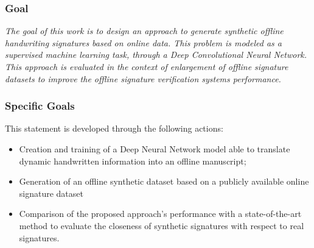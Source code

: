 \documentclass{beamer}
\begin{document}
\begin{frame}
\frametitle{Goal}

\centering\Large\textit{The goal of this work is to design an approach to generate synthetic offline handwriting signatures based on online data. 
This problem is modeled as a supervised machine learning task, through a Deep Convolutional Neural Network.
This approach is evaluated in the context of enlargement of offline signature datasets to improve the offline signature verification systems performance.}





\end{frame}

\begin{frame}
\frametitle{Specific Goals}
This statement is developed through the following actions:
\begin{itemize}
\item Creation and training of a Deep Neural Network model able to translate dynamic handwritten information into an offline manuscript;
\item Generation of an offline synthetic dataset based on a publicly available online signature dataset
\item Comparison of the proposed approach’s performance with a state-of-the-art method to evaluate the closeness of synthetic signatures with respect to real signatures. 
\end{itemize}


\end{frame}
\end{document}
